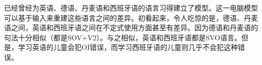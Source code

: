 
 \citet*{FPAG2007a}已经曾经为英语、德语、丹麦语和西班牙语的语言习得建立了模型。这一电脑模型可以基于输入来重建这些语言之间的差异。初看起来，令人吃惊的是，德语、丹麦语之间，英语和西班牙语之间在不定式使用方面甚至有差异。因为德语和丹麦语的句法十分相似（都是SOV+V2）。与之相似，英语和西班牙语都是SVO语言。但是，学习英语的儿童会犯OI错误，而学习西班牙语的儿童则几乎不会犯这种错误。

